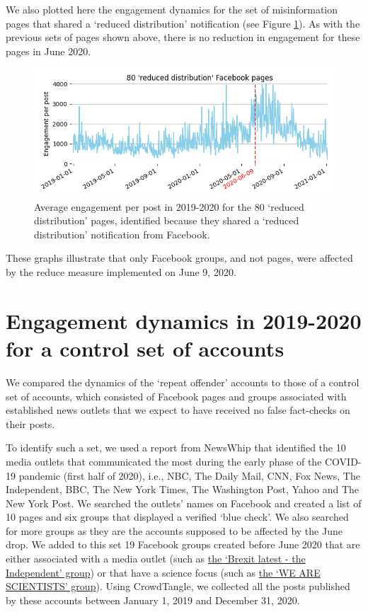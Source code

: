 \documentclass[review]{elsarticle}
\begin{document}
{We also plotted here the engagement dynamics for the set of misinformation pages that shared a `reduced distribution' notification (see Figure \ref{engagement_groups_and_pages_reduce}).
As with the previous sets of pages shown above, there is no reduction in engagement for these pages in June 2020.

\begin{figure}[!h]
\centering
\includegraphics[scale=0.5]{./../figure/supplementary_engagement_pages_reduce.png}
\caption{
Average engagement per post in 2019-2020 for the 80 `reduced distribution' pages, identified because they shared a `reduced distribution' notification from Facebook.
}
\label{engagement_groups_and_pages_reduce}
\end{figure}

These graphs illustrate that only Facebook groups, and not pages, were affected by the reduce measure implemented on June 9, 2020.

\section*{Engagement dynamics in 2019-2020 for a control set of accounts}

We compared the dynamics of the `repeat offender' accounts to those of a control set of accounts, which consisted of Facebook pages and groups associated with established news outlets that we expect to have received no false fact-checks on their posts.

To identify such a set, we used a report from NewsWhip \citep{NewsWhipReport} that identified the 10 media outlets that communicated the most during the early phase of the COVID-19 pandemic (first half of 2020), i.e., NBC, The Daily Mail, CNN, Fox News, The Independent, BBC, The New York Times, The Washington Post, Yahoo and The New York Post.
We searched the outlets' names on Facebook and created a list of 10 pages and six groups that displayed a verified `blue check'.
We also searched for more groups as they are the accounts supposed to be affected by the June drop.
We added to this set 19 Facebook groups created before June 2020 that are either associated with a media outlet (such as \href{https://www.facebook.com/groups/brexitlatest/}{the `Brexit latest - the Independent' group}) or that have a science focus (such as \href{https://www.facebook.com/groups/437670336804119/}{the `WE ARE SCIENTISTS' group}).
Using CrowdTangle, we collected all the posts published by these accounts between January 1, 2019 and December 31, 2020.

}
\end{document}
